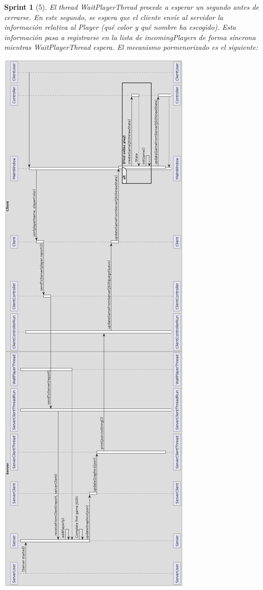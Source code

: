 \documentclass{article}
\theoremstyle{break}
\newtheorem*{sprint}{Sprint}
\begin{document}
\begin{sprint}[5]
El thread WaitPlayerThread procede a esperar un segundo antes de cerrarse. En este segundo, se espera que el cliente envíe al servidor la información relativa al Player (qué color y qué nombre ha escogido). Esta información pasa a registrarse en la lista de incomingPlayers de forma síncrona mientras WaitPlayerThread espera. El mecanismo pormenorizado es el siguiente:

\begin{center}
\includegraphics[scale=0.4]{empezarPartidaUml.png}
\end{center}


\end{sprint}
\end{document}
